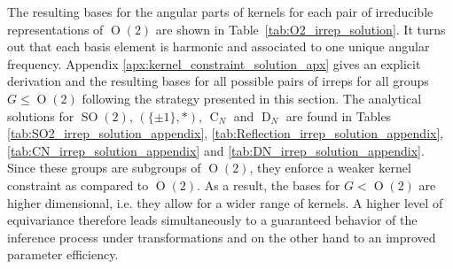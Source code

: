 \documentclass{article}
\newcommand{\apx}{Appendix\xspace
}
\renewcommand{\O}[1]{\ensuremath{\operatorname{O}(#1)}}
\newcommand{\SO}[1]{\ensuremath{\operatorname{SO}(#1)}}
\newcommand{\DN}{\ensuremath{\operatorname{D}_{\!N}}}
\newcommand{\CN}{\ensuremath{\operatorname{C}_{\!N}}}
\newcommand{\Flip}{(\{\pm 1\}, *)}
\begin{document}
The resulting bases for the angular parts of kernels for each pair of irreducible representations of $\O2$ are shown in Table~\ref{tab:O2_irrep_solution}.
It turns out that each basis element is harmonic and associated to one unique angular frequency.
\apx \ref{apx:kernel_constraint_solution_apx} gives an explicit derivation and the resulting bases for all possible pairs of irreps for all groups $G\leq\O2$ following the strategy presented in this section.
The analytical solutions for $\SO2$, $\Flip$, $\CN$ and $\DN$ are found in Tables
\ref{tab:SO2_irrep_solution_appendix},
\ref{tab:Reflection_irrep_solution_appendix},
\ref{tab:CN_irrep_solution_appendix} and
\ref{tab:DN_irrep_solution_appendix}.
Since these groups are subgroups of $\O2$, they enforce a weaker kernel constraint as compared to $\O2$.
As a result, the bases for $G<\O2$ are higher dimensional, i.e. they allow for a wider range of kernels.
A higher level of equivariance therefore leads simultaneously to a guaranteed behavior of the inference process under transformations and on the other hand to an improved parameter efficiency.
\end{document}
